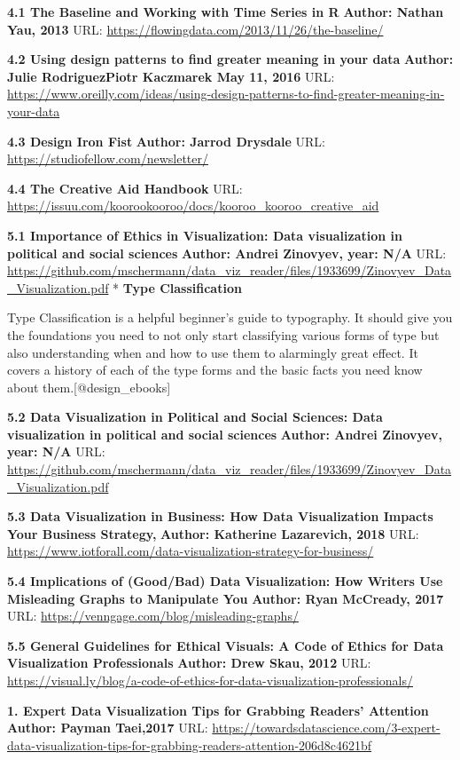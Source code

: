 \documentclass[]{book}
\theoremstyle{definition}
\theoremstyle{definition}
\theoremstyle{definition}
\theoremstyle{remark}
\begin{document}
\textbf{4.1 The Baseline and Working with Time Series in R}
\textbf{Author: Nathan Yau, 2013} URL:
\url{https://flowingdata.com/2013/11/26/the-baseline/}

\textbf{4.2 Using design patterns to find greater meaning in your data}
\textbf{Author: Julie RodriguezPiotr Kaczmarek May 11, 2016} URL:
\url{https://www.oreilly.com/ideas/using-design-patterns-to-find-greater-meaning-in-your-data}

\textbf{4.3 Design Iron Fist} \textbf{Author: Jarrod Drysdale} URL:
\url{https://studiofellow.com/newsletter/}

\textbf{4.4 The Creative Aid Handbook} URL:
\url{https://issuu.com/koorookooroo/docs/kooroo_kooroo_creative_aid}

\textbf{5.1 Importance of Ethics in Visualization: Data visualization in
political and social sciences} \textbf{Author: Andrei Zinovyev, year:
N/A} URL:
\url{https://github.com/mschermann/data_viz_reader/files/1933699/Zinovyev_Data_Visualization.pdf}
* \textbf{Type Classification}

Type Classification is a helpful beginner's guide to typography. It
should give you the foundations you need to not only start classifying
various forms of type but also understanding when and how to use them to
alarmingly great effect. It covers a history of each of the type forms
and the basic facts you need know about them.{[}@design\_ebooks{]}

\textbf{5.2 Data Visualization in Political and Social Sciences: Data
visualization in political and social sciences} \textbf{Author: Andrei
Zinovyev, year: N/A} URL:
\url{https://github.com/mschermann/data_viz_reader/files/1933699/Zinovyev_Data_Visualization.pdf}

\textbf{5.3 Data Visualization in Business: How Data Visualization
Impacts Your Business Strategy,} \textbf{Author: Katherine Lazarevich,
2018} URL:
\url{https://www.iotforall.com/data-visualization-strategy-for-business/}

\textbf{5.4 Implications of (Good/Bad) Data Visualization: How Writers
Use Misleading Graphs to Manipulate You} \textbf{Author: Ryan McCready,
2017} URL: \url{https://venngage.com/blog/misleading-graphs/}

\textbf{5.5 General Guidelines for Ethical Visuals: A Code of Ethics for
Data Visualization Professionals} \textbf{Author: Drew Skau, 2012} URL:
\url{https://visual.ly/blog/a-code-of-ethics-for-data-visualization-professionals/}

\textbf{1. Expert Data Visualization Tips for Grabbing Readers'
Attention} \textbf{Author: Payman Taei,2017} URL:
\url{https://towardsdatascience.com/3-expert-data-visualization-tips-for-grabbing-readers-attention-206d8c4621bf}
\end{document}
